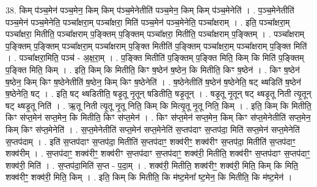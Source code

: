 \documentclass[17pt]{extarticle}
\begin{document}
38. किम् प॑ञ्च॒मेन॑ पञ्च॒मेन॒ किम् किम् प॑ञ्च॒मेनेतीति॑ पञ्च॒मेन॒ किम् किम् प॑ञ्च॒मेनेति॑ । . प॒ञ्च॒मेनेतीति॑ पञ्च॒मेन॑ पञ्च॒मेनेति॒ पञ्चा᳚क्षरा॒म् पञ्चा᳚क्षरा॒ मिति॑ पञ्च॒मेन॑ पञ्च॒मेनेति॒ पञ्चा᳚क्षराम् । . इति॒ पञ्चा᳚क्षरा॒म् पञ्चा᳚क्षरा॒ मितीति॒ पञ्चा᳚क्षराम् प॒ङ्क्तिम् प॒ङ्क्तिम् पञ्चा᳚क्षरा॒ मितीति॒ पञ्चा᳚क्षराम् प॒ङ्क्तिम् । . पञ्चा᳚क्षराम् प॒ङ्क्तिम् प॒ङ्क्तिम् पञ्चा᳚क्षरा॒म् पञ्चा᳚क्षराम् प॒ङ्क्ति मितीति॑ प॒ङ्क्तिम् पञ्चा᳚क्षरा॒म् पञ्चा᳚क्षराम् प॒ङ्क्ति मिति॑ । . पञ्चा᳚क्षरा॒मिति॒ पञ्च॑ - अ॒क्ष॒रा॒म् । . प॒ङ्क्ति मितीति॑ प॒ङ्क्तिम् प॒ङ्क्ति मिति॒ किम् कि मिति॑ प॒ङ्क्तिम् प॒ङ्क्ति मिति॒ किम् । . इति॒ किम् कि मितीति॒ किꣳ ष॒ष्ठेन॑ ष॒ष्ठेन॒ कि मितीति॒ किꣳ ष॒ष्ठेन॑ । . किꣳ ष॒ष्ठेन॑ ष॒ष्ठेन॒ किम् किꣳ ष॒ष्ठेनेतीति॑ ष॒ष्ठेन॒ किम् किꣳ ष॒ष्ठेनेति॑ । . ष॒ष्ठेनेतीति॑ ष॒ष्ठेन॑ ष॒ष्ठेनेति॒ षट् थ्षडिति॑ ष॒ष्ठेन॑ ष॒ष्ठेनेति॒ षट् । . इति॒ षट् थ्षडितीति॒ षडृ॒तू नृ॒तून् षडितीति॒ षडृ॒तून् । . षडृ॒तू नृ॒तून् षट् थ्षडृ॒तू निती त्यृ॒तून् षट् थ्षडृ॒तू निति॑ । . ऋ॒तू निती त्यृ॒तू नृ॒तू निति॒ किम् कि मित्यृ॒तू नृ॒तू निति॒ किम् । . इति॒ किम् कि मितीति॒ किꣳ स॑प्त॒मेन॑ सप्त॒मेन॒ कि मितीति॒ किꣳ स॑प्त॒मेन॑ । . किꣳ स॑प्त॒मेन॑ सप्त॒मेन॒ किम् किꣳ स॑प्त॒मेनेतीति॑ सप्त॒मेन॒ किम् किꣳ स॑प्त॒मेनेति॑ । . स॒प्त॒मेनेतीति॑ सप्त॒मेन॑ सप्त॒मेनेति॑ स॒प्तप॑दाꣳ स॒प्तप॑दा॒ मिति॑ सप्त॒मेन॑ सप्त॒मेनेति॑ स॒प्तप॑दाम् । . इति॑ स॒प्तप॑दाꣳ स॒प्तप॑दा॒ मितीति॑ स॒प्तप॑दाꣳ॒॒ शक्व॑रीꣳ॒॒ शक्व॑रीꣳ स॒प्तप॑दा॒ मितीति॑ स॒प्तप॑दाꣳ॒॒ शक्व॑रीम् । . स॒प्तप॑दाꣳ॒॒ शक्व॑रीꣳ॒॒ शक्व॑रीꣳ स॒प्तप॑दाꣳ स॒प्तप॑दाꣳ॒॒ शक्व॑री॒ मितीति॒ शक्व॑रीꣳ स॒प्तप॑दाꣳ स॒प्तप॑दाꣳ॒॒ शक्व॑री॒ मिति॑ । . स॒प्तप॑दा॒मिति॑ स॒प्त - प॒दा॒म् । . शक्व॑री॒ मितीति॒ शक्व॑रीꣳ॒॒ शक्व॑री॒ मिति॒ किम् कि मिति॒ शक्व॑रीꣳ॒॒ शक्व॑री॒ मिति॒ किम् । . इति॒ किम् कि मितीति॒ कि म॑ष्ट॒मेना᳚ ष्ट॒मेन॒ कि मितीति॒ कि म॑ष्ट॒मेन॑ । \newline
\pagebreak
{}
\end{document}
